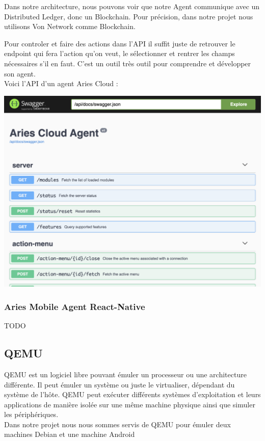 \documentclass[12pt, openany]{report}
\begin{document}
\vspace{5mm}
Dans notre architecture, nous pouvons voir que notre Agent communique avec un Distributed Ledger, donc un Blockchain. Pour précision, dans notre projet nous utilisons Von Network comme Blockchain.

\vspace{2mm}
Pour controler et faire des actions dans l'API il suffit juste de retrouver le endpoint qui fera l'action qu'on veut, le sélectionner et rentrer les champs nécessaires s'il en faut. C'est un outil très outil pour comprendre et développer son agent. \\
Voici l'API d'un agent Aries Cloud : 

\begin{center}
\includegraphics[scale=0.2]{adminApi.png}
\end{center}


\subsubsection{Aries Mobile Agent React-Native}
\noindent 
\begin{flushleft}
TODO
\end{flushleft}

\subsection{QEMU}
\noindent 
\begin{flushleft}
QEMU est un logiciel libre  pouvant émuler un processeur ou une architecture différente. Il peut émuler un système ou juste le virtualiser, dépendant du système de l'hôte. QEMU peut exécuter différents systèmes d'exploitation et leurs applications de manière isolée sur une même machine physique ainsi que simuler les périphériques. \\
Dans notre projet nous nous sommes servis de QEMU pour émuler deux machines Debian et une machine Android
\end{flushleft}
\end{document}

